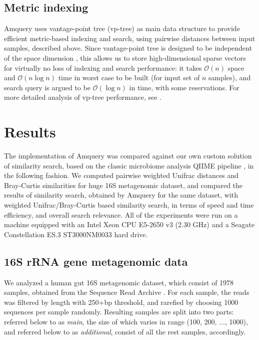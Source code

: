 \documentclass[10pt,letterpaper]{article}
\begin{document}
\subsection*{Metric indexing}
Amquery uses vantage-point tree (vp-tree) \cite{yianilos1993data, chavez2001searching} as main data structure to provide efficient metric-based indexing and search, using pairwise distances between input 
samples, described above.
Since vantage-point tree is designed to be independent of the space dimension \cite{yianilos1993data}, this allows us to store high-dimensional sparse vectors for virtually no loss of indexing and 
search performance: it takes $\mathcal{O}(n)$ space and $\mathcal{O}(n \log n)$ time in worst case to be built (for input set of $n$ samples), and search query is argued to be $\mathcal{O}(\log n)$ in time, with some reservations. 
For more detailed analysis of vp-tree performance, see \cite{yianilos1993data}.


\section*{Results}
The implementation of Amquery was compared against our own custom solution of similarity search, based on the classic microbiome analysis QIIME pipeline \cite{caporaso2010qiime}, in the following fashion.
We computed pairwise weighted Unifrac distances \cite{lozupone2011unifrac} and Bray-Curtis similarities for huge 16S metagenomic dataset, and compared the results of similarity search, obtained by Amquery for the same dataset, with weighted Unifrac/Bray-Curtis based similarity search, in terms of speed and time efficiency, and overall search relevance. All of the experiments were run on a machine equipped with an Intel Xeon CPU E5-2650 v3 (2.30 GHz) and a 
Seagate Constellation ES.3 ST3000NM0033 hard drive.

\subsection*{16S rRNA gene metagenomic data}
We analyzed a human gut 16S metagenomic dataset, which consist of 1978 samples, obtained from the Sequence Read Archive \cite{leinonen2010sequence}. 
For each sample, the reads was filtered by length with 250+bp threshold, and rarefied by choosing 1000 sequences per sample randomly.
Resulting samples are split into two parts: referred below to as \textit{main}, the size of which varies in range (100, 200, $\dots$, 1000), and referred below to as \textit{additional}, consist of all the rest samples, accordingly. 
\end{document}
